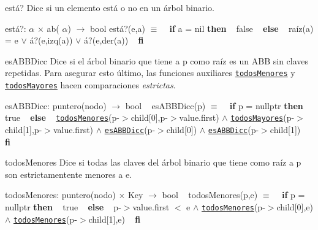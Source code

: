 \begin{DoxyParagraph}{está?}
Dice si un elemento está o no en un árbol binario.

está?\+:  $\alpha$ $\times$ ab( $\alpha$) $\to$ bool está?(e,a) $\equiv$ ~\newline
{\bfseries if} a = nil {\bfseries then} ~\newline
false ~\newline
{\bfseries else} ~\newline
raíz(a) = e $\lor$ á?(e,izq(a)) $\lor$ á?(e,der(a)) ~\newline
 {\bfseries fi} 


\end{DoxyParagraph}
\begin{DoxyParagraph}{es\+A\+B\+B\+Dicc}
Dice si el árbol binario que tiene a p como raíz es un A\+BB sin claves repetidas. Para asegurar esto último, las funciones auxiliares \href{axiomas.html#todosMenores}{\tt todos\+Menores} y \href{axiomas.html#todosMayores}{\tt todos\+Mayores} hacen comparaciones {\itshape estrictas}.

es\+A\+B\+B\+Dicc\+: puntero(nodo) $\to$ bool ~\newline
es\+A\+B\+B\+Dicc(p) $\equiv$ ~\newline
{\bfseries if} p = nullptr {\bfseries then} ~\newline
true ~\newline
{\bfseries else} ~\newline
\href{axiomas.html#todosMenores}{\tt todos\+Menores}(p-\/$>$child\mbox{[}0\mbox{]},p-\/$>$value.\+first) $\land$ \href{axiomas.html#todosMayores}{\tt todos\+Mayores}(p-\/$>$child\mbox{[}1\mbox{]},p-\/$>$value.\+first) $\land$ \href{axiomas.html#esABBDicc}{\tt es\+A\+B\+B\+Dicc}(p-\/$>$child\mbox{[}0\mbox{]}) $\land$ \href{axiomas.html#esABBDicc}{\tt es\+A\+B\+B\+Dicc}(p-\/$>$child\mbox{[}1\mbox{]}) ~\newline
 {\bfseries fi} 


\end{DoxyParagraph}
\begin{DoxyParagraph}{todos\+Menores}
Dice si todas las claves del árbol binario que tiene como raíz a p son estrictamentente menores a e.

todos\+Menores\+: puntero(nodo) $\times$ Key $\to$ bool ~\newline
todos\+Menores(p,e) $\equiv$ ~\newline
{\bfseries if} p = nullptr {\bfseries then} ~\newline
true ~\newline
{\bfseries else} ~\newline
p-\/$>$value.\+first $<$ e $\land$ \href{axiomas.html#todosMenores}{\tt todos\+Menores}(p-\/$>$child\mbox{[}0\mbox{]},e) $\land$ \href{axiomas.html#todosMenores}{\tt todos\+Menores}(p-\/$>$child\mbox{[}1\mbox{]},e) ~\newline
 {\bfseries fi} 


\end{DoxyParagraph}
